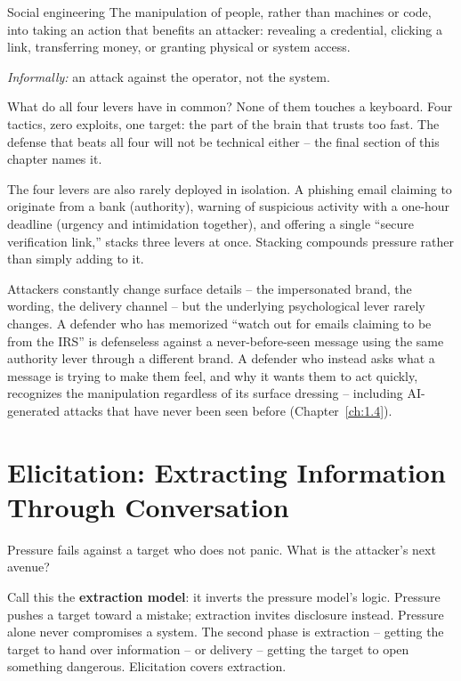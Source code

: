 \begin{definition}{Social engineering}
The manipulation of people, rather than machines or code, into taking an action that benefits an
attacker: revealing a credential, clicking a link, transferring money, or granting physical or
system access.

\emph{Informally:} an attack against the operator, not the system.
\end{definition}

What do all four levers have in common? None of them touches a keyboard. Four tactics, zero
exploits, one target: the part of the brain that trusts too fast. The defense that beats all four
will not be technical either -- the final section of this chapter names it.

The four levers are also rarely deployed in isolation. A phishing email claiming to originate from
a bank (authority), warning of suspicious activity with a one-hour deadline (urgency and
intimidation together), and offering a single ``secure verification link,'' stacks three levers at
once. Stacking compounds pressure rather than simply adding to it.

\begin{example}
Attackers constantly change surface details -- the impersonated brand, the wording, the delivery
channel -- but the underlying psychological lever rarely changes. A defender who has memorized
``watch out for emails claiming to be from the IRS'' is defenseless against a never-before-seen
message using the same authority lever through a different brand. A defender who instead asks what
a message is trying to make them feel, and why it wants them to act quickly, recognizes the
manipulation regardless of its surface dressing -- including AI-generated attacks that have never
been seen before (Chapter~\ref{ch:1.4}).
\end{example}

\section{Elicitation: Extracting Information Through Conversation}

Pressure fails against a target who does not panic. What is the attacker's next avenue?

Call this the \textbf{extraction model}: it inverts the pressure model's logic. Pressure pushes a
target toward a mistake; extraction invites disclosure instead. Pressure alone never compromises a
system. The second phase is extraction -- getting the target to hand over information -- or
delivery -- getting the target to open something dangerous. Elicitation covers extraction.

